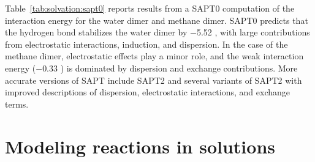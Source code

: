\documentclass[../Main/chem371-notes.tex]{subfiles}
\begin{document}
Table~\ref{tab:solvation:sapt0} reports results from a SAPT0 computation of the interaction energy for the water dimer and methane dimer.
SAPT0 predicts that the hydrogen bond stabilizes the water dimer by $-$5.52 \kcal, with large contributions from electrostatic interactions, induction, and dispersion.
In the case of the methane dimer, electrostatic effects play a minor role, and the weak interaction energy ($-$0.33 \kcal) is dominated by dispersion and exchange contributions.
More accurate versions of SAPT include SAPT2 and several variants of SAPT2 with improved descriptions of dispersion, electrostatic interactions, and exchange terms.

\section{Modeling reactions in solutions}

\end{document}
